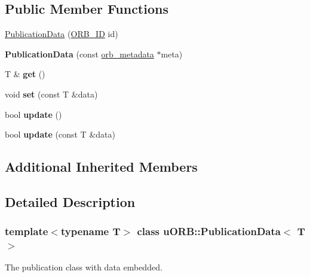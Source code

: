 \subsection*{Public Member Functions}
\begin{DoxyCompactItemize}
\item 
\hyperlink{classuORB_1_1PublicationData_a666841966b36304506549f012b65da49}{Publication\+Data} (\hyperlink{uORB_8h_a96af5434ec1acdf24287bd7851b0413f}{O\+R\+B\+\_\+\+ID} id)
\item 
\mbox{\label{classuORB_1_1PublicationData_ae93ef2f5bc7e52a1c59f5b421134ee39}} 
{\bfseries Publication\+Data} (const \hyperlink{structorb__metadata}{orb\+\_\+metadata} $\ast$meta)
\item 
\mbox{\label{classuORB_1_1PublicationData_a713677de3cb15c58e29294f2009075ba}} 
T \& {\bfseries get} ()
\item 
\mbox{\label{classuORB_1_1PublicationData_a1e334845584e67bf990554245f73cb7a}} 
void {\bfseries set} (const T \&data)
\item 
\mbox{\label{classuORB_1_1PublicationData_a59a09d55fc1196a57c39bc7b36ee997d}} 
bool {\bfseries update} ()
\item 
\mbox{\label{classuORB_1_1PublicationData_aa081268dd303e6210a2fa62688b89333}} 
bool {\bfseries update} (const T \&data)
\end{DoxyCompactItemize}
\subsection*{Additional Inherited Members}


\subsection{Detailed Description}
\subsubsection*{template$<$typename T$>$\newline
class u\+O\+R\+B\+::\+Publication\+Data$<$ T $>$}

The publication class with data embedded. 


